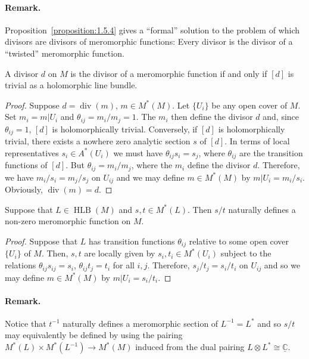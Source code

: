 \paragraph*{Remark.} Proposition~\ref{proposition:1.5.4} gives a ``formal'' solution to the problem of which divisors are divisors of meromorphic functions: Every divisor is the divisor of a ``twisted'' meromorphic function.

 A divisor $d$ on $M$ is the divisor of a meromorphic function if and only if $[d]$ is trivial as a holomorphic line bundle.
\begin{proof}
Suppose $d=\operatorname{div}(m)$, $m\in M^*(M)$. Let $\{U_i\}$ be any open cover of $M$. Set $m_i=m|U_i$ and $\theta_{ij}=m_i/m_j=1$. The $m_i$ then define the divisor $d$ and, since $\theta_{ij}=1$, $[d]$ is holomorphically trivial. Conversely, if $[d]$ is holomorphically trivial, there exists a nowhere zero analytic section $s$ of $[d]$. In terms of local representatives $s_i\in A^*(U_i)$ we must have $\theta_{ij}s_i=s_j$, where $\theta_{ij}$ are the transition functions of $[d]$. But $\theta_{ij}=m_i/m_j$, where the $m_i$ define the divisor $d$. Therefore, we have $m_i/s_i=m_j/s_j$ on $U_{ij}$ and we may define $m\in M^*(M)$ by $m|U_i=m_i/s_i$. Obviously, $\operatorname{div}(m)=d$.
\end{proof}
 Suppose that $L\in\operatorname{HLB}(M)$ and $s,t\in M^*(L)$. Then $s/t$ naturally defines a non-zero meromorphic function on $M$.
\begin{proof}
Suppose that $L$ has transition functions $\theta_{ij}$ relative to some open cover $\{U_i\}$ of $M$. Then, $s,t$ are locally given by $s_i,t_i\in M^*(U_i)$ subject to the relations $\theta_{ij}s_{ij}=s_i$, $\theta_{ij}t_j=t_i$ for all $i,j$. Therefore, $s_j/t_j=s_i/t_i$ on $U_{ij}$ and so we may define $m\in M^*(M)$ by $m|U_i=s_i/t_i$.
\end{proof}
\paragraph*{Remark.} Notice that $t^{-1}$ naturally defines a meromorphic section of $L^{-1}=L^*$ and so $s/t$ may equivalently be defined by using the pairing $M^*(L)\times M^*(L^{-1})\to M^*(M)$ induced from the dual pairing $L\otimes L^*\cong\underline{\mathbb C}$.

